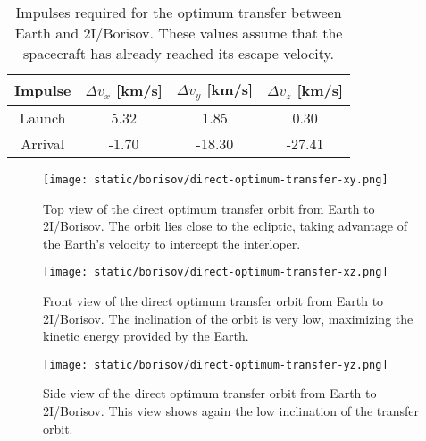 \vspace{1cm}
\begin{table}[H]
  \centering
  \begin{tabular}{|c|c|c|c|}
    \hline
    Impulse & $\Delta v_x$ [km/s] & $\Delta v_y$ [km/s] & $\Delta v_z$ [km/s] \\
    \hline
    Launch & 5.32 & 1.85 & 0.30 \\
    \hline
    Arrival & -1.70 & -18.30 & -27.41 \\
    \hline
  \end{tabular}
  \caption[Impulses required for the optimum transfer between Earth and
        2I/Borisov.]{Impulses required for the optimum transfer between Earth
        and 2I/Borisov. These values assume that the spacecraft has already
        reached its escape velocity.}
  \label{tab:borisov-direct-transfer-impulses}
\end{table}

\begin{figure}[H]
  \centering
  \texttt{[image: static/borisov/direct-optimum-transfer-xy.png]}
  \caption[Top view of the direct optimum transfer orbit from Earth to
        2I/Borisov]{
    Top view of the direct optimum transfer orbit from Earth to 2I/Borisov.
    The orbit lies close to the ecliptic, taking advantage of the Earth's
    velocity to intercept the interloper.
  }
  \label{fig:optimum_borisov_orbit_xy}
\end{figure}

\begin{figure}[H]
  \centering
  \texttt{[image: static/borisov/direct-optimum-transfer-xz.png]}
  \caption[Front view of the direct optimum transfer orbit from Earth to 2I/Borisov]{
    Front view of the direct optimum transfer orbit from Earth to 2I/Borisov.
    The inclination of the orbit is very low, maximizing the kinetic energy
    provided by the Earth.
  }
  \label{fig:optimum_borisov_orbit_yz}
\end{figure}

\begin{figure}[H]
  \centering
  \texttt{[image: static/borisov/direct-optimum-transfer-yz.png]}
  \caption[Side view of the direct optimum transfer orbit from Earth to 2I/Borisov]{
    Side view of the direct optimum transfer orbit from Earth to 2I/Borisov.
    This view shows again the low inclination of the transfer orbit.}
  \label{fig:optimum_borisov_orbit_xz}
\end{figure}
